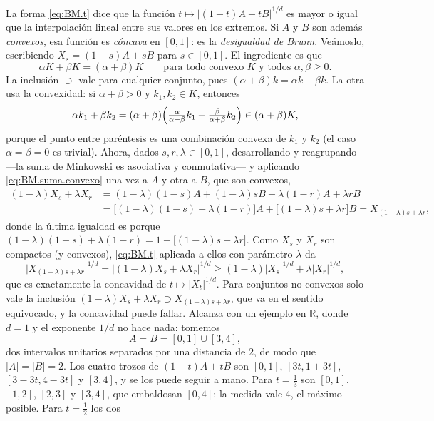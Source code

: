 \documentclass[12pt, a4paper]{amsbook}
\newcommand{\R}{{\mathbb R}}
\theoremstyle{remark}
\theoremstyle{definition}
\numberwithin{section}{chapter}
\numberwithin{subsection}{section}
\numberwithin{equation}{section}
\numberwithin{figure}{chapter}
\begin{document}
La forma \eqref{eq:BM.t} dice que la función $t\mapsto|(1-t)A+tB|^{1/d}$ es
mayor o igual que la interpolación lineal entre sus valores en los extremos.
Si $A$ y $B$ son además \emph{convexos}, esa función es \emph{cóncava} en
$[0,1]$: es la \emph{desigualdad de Brunn}. Veámoslo, escribiendo
$X_s=(1-s)A+sB$ para $s\in[0,1]$. El ingrediente es que
\begin{equation}\label{eq:BM.suma.convexo}
\alpha K+\beta K=(\alpha+\beta)K
\qquad\text{para todo convexo $K$ y todos $\alpha,\beta\ge0$.}
\end{equation}
La inclusión $\supset$ vale para cualquier conjunto, pues
$(\alpha+\beta)k=\alpha k+\beta k$. La otra usa la convexidad: si
$\alpha+\beta>0$ y $k_1,k_2\in K$, entonces
\[
\alpha k_1+\beta k_2
=(\alpha+\beta)\Bigl(\tfrac{\alpha}{\alpha+\beta}k_1
  +\tfrac{\beta}{\alpha+\beta}k_2\Bigr)\in(\alpha+\beta)K,
\]
porque el punto entre paréntesis es una combinación convexa de $k_1$ y $k_2$
(el caso $\alpha=\beta=0$ es trivial). Ahora, dados $s,r,\lambda\in[0,1]$,
desarrollando y reagrupando —la suma de Minkowski es asociativa y
conmutativa— y aplicando \eqref{eq:BM.suma.convexo} una vez a $A$ y otra a
$B$, que son convexos,
\begin{align*}
(1-\lambda)X_s+\lambda X_r
&=(1-\lambda)(1-s)A+(1-\lambda)sB+\lambda(1-r)A+\lambda rB\\
&=\bigl[(1-\lambda)(1-s)+\lambda(1-r)\bigr]A
 +\bigl[(1-\lambda)s+\lambda r\bigr]B
 =X_{(1-\lambda)s+\lambda r},
\end{align*}
donde la última igualdad es porque
$(1-\lambda)(1-s)+\lambda(1-r)=1-\bigl[(1-\lambda)s+\lambda r\bigr]$. Como
$X_s$ y $X_r$ son compactos (y convexos), \eqref{eq:BM.t} aplicada a ellos
con parámetro $\lambda$ da
\[
\bigl|X_{(1-\lambda)s+\lambda r}\bigr|^{1/d}
=\bigl|(1-\lambda)X_s+\lambda X_r\bigr|^{1/d}
\ge(1-\lambda)|X_s|^{1/d}+\lambda|X_r|^{1/d},
\]
que es exactamente la concavidad de $t\mapsto|X_t|^{1/d}$. Para conjuntos
no convexos solo vale la inclusión
$(1-\lambda)X_s+\lambda X_r\supset X_{(1-\lambda)s+\lambda r}$, que va en el
sentido equivocado, y la concavidad puede fallar. Alcanza con un ejemplo en
$\R$, donde $d=1$ y el exponente $1/d$ no hace nada: tomemos
\[
A=B=[0,1]\cup[3,4],
\]
dos intervalos unitarios separados por una distancia de $2$, de modo que
$|A|=|B|=2$. Los cuatro trozos de $(1-t)A+tB$ son
$[0,1]$, $[3t,1+3t]$, $[3-3t,4-3t]$ y $[3,4]$, y se los puede seguir a mano.
Para $t=\tfrac13$ son $[0,1]$, $[1,2]$, $[2,3]$ y $[3,4]$, que embaldosan
$[0,4]$: la medida vale $4$, el máximo posible. Para $t=\tfrac12$ los dos
\end{document}
